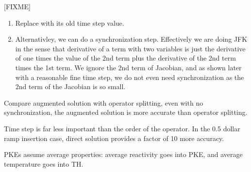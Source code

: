 \documentclass{school-22.211-notes}
\begin{document}
[FIXME]
\begin{enumerate}
\item Replace with its old time step value. 

\item Alternativley, we can do a synchronization step. Effectively we are doing JFK in the sense that derivative of a term with two variables is just the derivative of one times the value of the 2nd term plus the derivative of the 2nd term times the 1st term. We ignore the 2nd term of Jacobian, and as shown later with a reasonable fine time step, we do not even need synchronization as the 2nd term of the Jacobian is so small. 
\end{enumerate}


Compare augmented solution with operator splitting, even with no synchronization, the augmented solution is more accurate than operator splitting. 

Time step is far less important than the order of the operator. In the 0.5 dollar ramp insertion case, direct solution provides a factor of 10 more accuracy. 

PKEs assume average properties: average reactivity goes into PKE, and average temperature goes into TH. 
\end{document}
